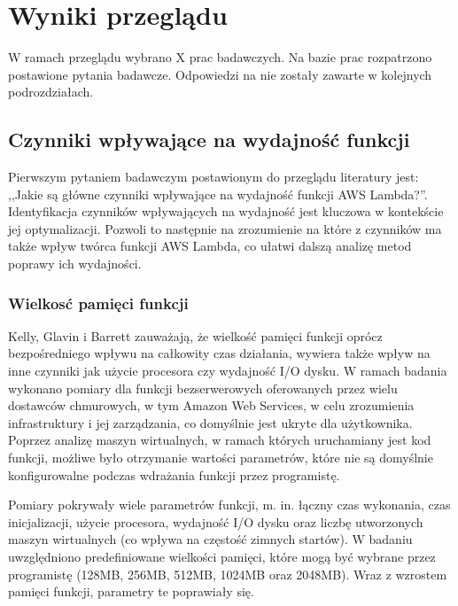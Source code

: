 \section{Wyniki przeglądu}\label{chapter:przeglad_literatury_wyniki}

W ramach przeglądu wybrano X prac badawczych. Na bazie prac rozpatrzono postawione pytania badawcze. Odpowiedzi na nie zostały zawarte w kolejnych podrozdziałach.



\subsection{Czynniki wpływające na wydajność funkcji}\label{chapter:przeglad_literatury_wyniki_czynniki}

Pierwszym pytaniem badawczym postawionym do przeglądu literatury jest: ,,Jakie są główne czynniki wpływające na wydajność funkcji AWS Lambda?''.
Identyfikacja czynników wpływających na wydajność jest kluczowa w kontekście jej optymalizacji.
Pozwoli to następnie na zrozumienie na które z czynników ma także wpływ twórca funkcji AWS Lambda, co ułatwi dalszą analizę metod poprawy ich wydajności.

\subsubsection*{Wielkosć pamięci funkcji}

Kelly, Glavin i Barrett \cite{9284261} zauważają, że wielkość pamięci funkcji oprócz bezpośredniego wpływu na całkowity czas działania, wywiera także wpływ na inne czynniki jak użycie procesora czy wydajność I/O dysku. 
W ramach badania wykonano pomiary dla funkcji bezserwerowych oferowanych przez wielu dostawców chmurowych, w tym Amazon Web Services, w celu zrozumienia infrastruktury i jej zarządzania, co domyślnie jest ukryte dla użytkownika.   
Poprzez analizę maszyn wirtualnych, w ramach których uruchamiany jest kod funkcji, możliwe było otrzymanie wartości parametrów, które nie są domyślnie konfigurowalne podczas wdrażania funkcji przez programistę.

Pomiary pokrywały wiele parametrów funkcji, m. in. łączny czas wykonania, czas inicjalizacji, użycie procesora, wydajność I/O dysku oraz liczbę utworzonych maszyn wirtualnych (co wpływa na częstość zimnych startów). 
W badaniu uwzględniono predefiniowane wielkości pamięci, które mogą być wybrane przez programistę (128MB, 256MB, 512MB, 1024MB oraz 2048MB).
Wraz z wzrostem pamięci funkcji, parametry te poprawiały się.

